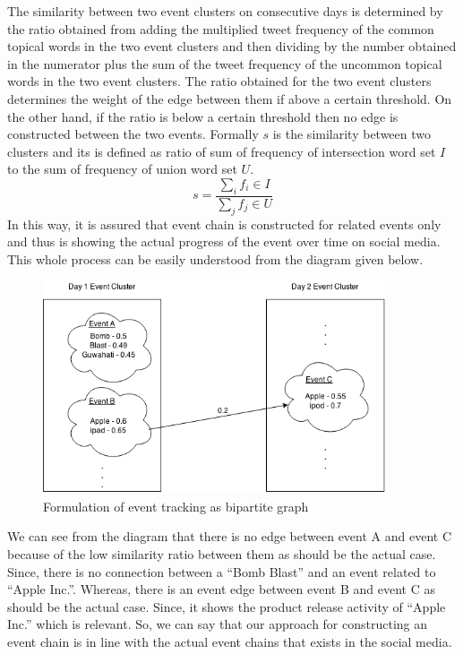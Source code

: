 The similarity between two event clusters on consecutive days is determined by the ratio obtained from adding the multiplied tweet frequency of the common topical words in the two event clusters and then dividing by the number obtained in the numerator plus the sum of the tweet frequency of the uncommon topical words in the two event clusters. The ratio obtained for the two event clusters determines the weight of the edge between them if above a certain threshold. On the other hand, if the ratio is below a certain threshold then no edge is constructed between the two events. Formally $s$ is the similarity between two clusters and its is defined as ratio of sum of frequency of intersection word set $I$ to the sum of frequency of union word set $U$.
\begin{equation}
s = \frac{\sum_i f_i \in I}{\sum_j f_j \in U}
\end{equation}
In this way, it is assured that event chain is constructed for related events only and thus is showing the actual progress of the event over time on social media. This whole process can be easily understood from the diagram given below.

\begin{figure} 
    \centering 
    \includegraphics[width=0.9\textwidth]{Evolution1.png} 
    \caption{Formulation of event tracking as bipartite graph} 
    \label{fig:eventtracking}
\end{figure}

We can see from the diagram that there is no edge between event A and event C because of the low similarity ratio between them as should be the actual case. Since, there is no connection between a “Bomb Blast” and an event related to “Apple Inc.”. Whereas, there is an event edge between event B and event C as should be the actual case. Since, it shows the product release activity of “Apple Inc.” which is relevant. So, we can say that our approach for constructing an event chain is in line with the actual event chains that exists in the social media.